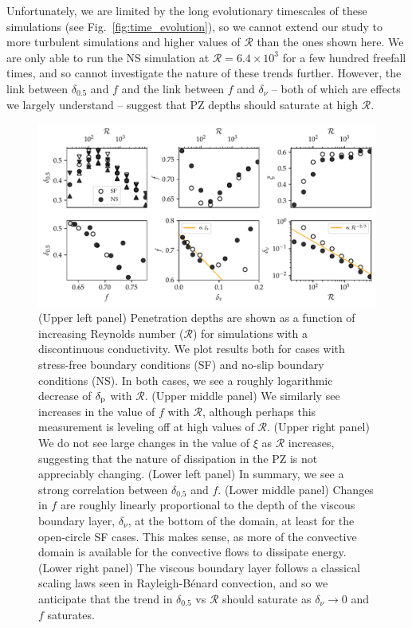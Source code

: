\documentclass[twocolumn]{aastex631}
\newcommand{\delp}{\ensuremath{\delta_{\rm{p}}}}
\newcommand{\mR}{\ensuremath{\mathcal{R}}}
\begin{document}
Unfortunately, we are limited by the long evolutionary timescales of these simulations (see Fig.~\ref{fig:time_evolution}), so we cannot extend our study to more turbulent simulations and higher values of $\mR$ than the ones shown here.
We are only able to run the NS simulation at $\mR = 6.4 \times 10^3$ for a few hundred freefall times, and so cannot investigate the nature of these trends further.
However, the link between $\delta_{0.5}$ and $f$ and the link between $f$ and $\delta_\nu$ -- both of which are effects we largely understand -- suggest that PZ depths should saturate at high $\mR$.


\begin{figure}[t!]
\centering
\includegraphics{parameters_vs_re.pdf}
\caption{
(Upper left panel) Penetration depths are shown as a function of increasing Reynolds number ($\mR$) for simulations with a discontinuous conductivity.
We plot results both for cases with stress-free boundary conditions (SF) and no-slip boundary conditions (NS).
In both cases, we see a roughly logarithmic decrease of $\delp$ with $\mR$.
(Upper middle panel) We similarly see increases in the value of $f$ with $\mR$, although perhaps this measurement is leveling off at high values of $\mR$.
(Upper right panel) We do not see large changes in the value of $\xi$ as $\mR$ increases, suggesting that the nature of dissipation in the PZ is not appreciably changing.
(Lower left panel) In summary, we see a strong correlation between $\delta_{0.5}$ and $f$.
(Lower middle panel) Changes in $f$ are roughly linearly proportional to the depth of the viscous boundary layer, $\delta_\nu$, at the bottom of the domain, at least for the open-circle SF cases.
This makes sense, as more of the convective domain is available for the convective flows to dissipate energy.
(Lower right panel) The viscous boundary layer follows a classical scaling laws seen in Rayleigh-B\'{e}nard convection, and so we anticipate that the trend in $\delta_{0.5}$ vs $\mR$ should saturate as $\delta_{\nu} \rightarrow 0$ and $f$ saturates.
\label{fig:parameters_vs_re}
}
\end{figure}
\end{document}
